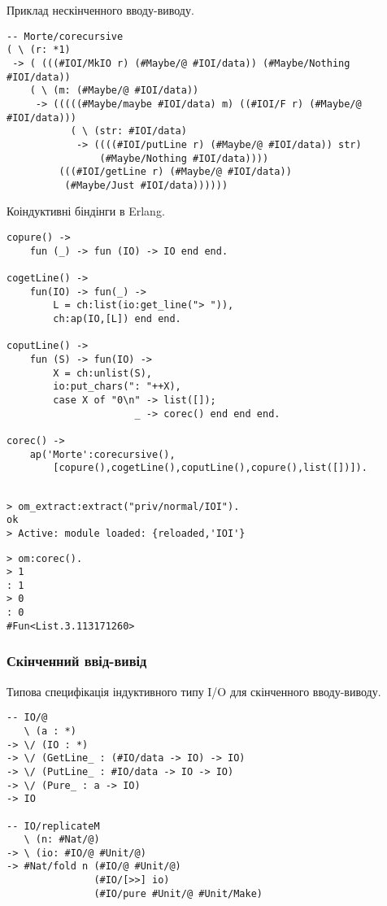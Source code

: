 \documentclass{article}
\begin{document}
Приклад нескінченного вводу-виводу.

\begin{lstlisting}[mathescape=true]
-- Morte/corecursive
( \ (r: *1)
 -> ( (((#IOI/MkIO r) (#Maybe/@ #IOI/data)) (#Maybe/Nothing #IOI/data))
    ( \ (m: (#Maybe/@ #IOI/data))
     -> (((((#Maybe/maybe #IOI/data) m) ((#IOI/F r) (#Maybe/@ #IOI/data)))
           ( \ (str: #IOI/data)
            -> ((((#IOI/putLine r) (#Maybe/@ #IOI/data)) str)
                (#Maybe/Nothing #IOI/data))))
         (((#IOI/getLine r) (#Maybe/@ #IOI/data))
          (#Maybe/Just #IOI/data))))))
\end{lstlisting}

Коіндуктивні біндінги в Erlang.

\begin{lstlisting}[mathescape=true]
copure() ->
    fun (_) -> fun (IO) -> IO end end.

cogetLine() ->
    fun(IO) -> fun(_) ->
        L = ch:list(io:get_line("> ")),
        ch:ap(IO,[L]) end end.

coputLine() ->
    fun (S) -> fun(IO) ->
        X = ch:unlist(S),
        io:put_chars(": "++X),
        case X of "0\n" -> list([]);
                      _ -> corec() end end end.

corec() ->
    ap('Morte':corecursive(),
        [copure(),cogetLine(),coputLine(),copure(),list([])]).
\end{lstlisting}

\begin{lstlisting}[mathescape=true]

> om_extract:extract("priv/normal/IOI").
ok
> Active: module loaded: {reloaded,'IOI'}
\end{lstlisting}

\begin{lstlisting}[mathescape=true]
> om:corec().
> 1
: 1
> 0
: 0
#Fun<List.3.113171260>
\end{lstlisting}

\subsubsection{Скінченний ввід-вивід}

Типова специфікація індуктивного типу I/O для скінченного вводу-виводу.

\begin{lstlisting}[mathescape=true]
-- IO/@
   \ (a : *)
-> \/ (IO : *)
-> \/ (GetLine_ : (#IO/data -> IO) -> IO)
-> \/ (PutLine_ : #IO/data -> IO -> IO)
-> \/ (Pure_ : a -> IO)
-> IO

-- IO/replicateM
   \ (n: #Nat/@)
-> \ (io: #IO/@ #Unit/@)
-> #Nat/fold n (#IO/@ #Unit/@)
               (#IO/[>>] io)
               (#IO/pure #Unit/@ #Unit/Make)
\end{lstlisting}
\end{document}
